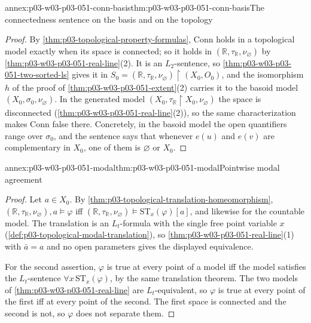 \begin{annexitem}{annex:p03-w03-p03-051-conn-basis}{thm:p03-w03-p03-051-conn-basis}{The connectedness sentence on the basis and on the topology}
\begin{proof}
By \cref{thm:p03-topological-property-formulas}, \(\mathrm{Conn}\) holds in a
topological model exactly when its space is connected; so it holds in
\((\mathbb R,\tau_{\mathbb R},\nu_\varnothing)\) by
\cref{thm:p03-w03-p03-051-real-line}(2). It is an \(L_2\)-sentence, so
\cref{thm:p03-w03-p03-051-two-sorted-ls} gives it in
\(S_0=(\mathbb R,\tau_{\mathbb R},\nu_\varnothing)\restriction(X_0,O_0)\),
and the isomorphism \(h\) of the proof of
\cref{thm:p03-w03-p03-051-extent}(2) carries it to the basoid model
\((X_0,\sigma_0,\nu_\varnothing)\). In the generated model
\((X_0,\tau_{\mathbb R}\restriction X_0,\nu_\varnothing)\) the space is
disconnected (\cref{thm:p03-w03-p03-051-real-line}(2)), so the same
characterization makes \(\mathrm{Conn}\) false there. Concretely, in the
basoid model the open quantifiers range over \(\sigma_0\), and the
sentence says that whenever \(e(u)\) and \(e(v)\) are complementary in
\(X_0\), one of them is \(\varnothing\) or \(X_0\).
\end{proof}
\end{annexitem}

\begin{annexitem}{annex:p03-w03-p03-051-modal}{thm:p03-w03-p03-051-modal}{Pointwise modal agreement}
\begin{proof}
Let \(a\in X_0\). By \cref{thm:p03-topological-translation-homeomorphism},
\((\mathbb R,\tau_{\mathbb R},\nu_\varnothing),a\models\varphi\) iff
\((\mathbb R,\tau_{\mathbb R},\nu_\varnothing)\models\mathrm{ST}_x(\varphi)[a]\),
and likewise for the countable model. The translation is an
\(L_t\)-formula with the single free point variable \(x\)
(\cref{def:p03-topological-modal-translation}), so
\cref{thm:p03-w03-p03-051-real-line}(1) with \(\bar a=a\) and no open
parameters gives the displayed equivalence.

For the second assertion, \(\varphi\) is true at every point of a model iff
the model satisfies the \(L_t\)-sentence \(\forall x\,\mathrm{ST}_x(\varphi)\),
by the same translation theorem. The two models of
\cref{thm:p03-w03-p03-051-real-line} are \(L_t\)-equivalent, so \(\varphi\)
is true at every point of the first iff at every point of the second. The
first space is connected and the second is not, so \(\varphi\) does not
separate them.
\end{proof}
\end{annexitem}
